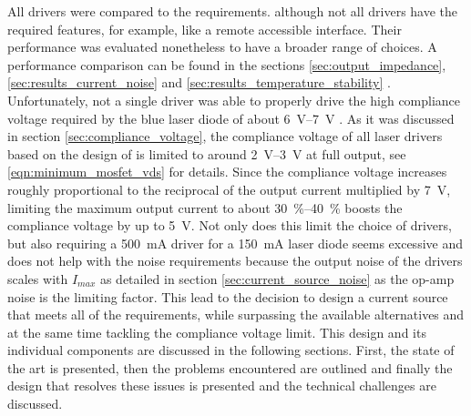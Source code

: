 All drivers were compared to the requirements. although not all drivers have the required features, for example, like a remote accessible interface. Their performance was evaluated nonetheless to have a broader range of choices. A performance comparison can be found in the sections \ref{sec:output_impedance}, \ref{sec:results_current_noise} and \ref{sec:results_temperature_stability} . Unfortunately, not a single driver was able to properly drive the high compliance voltage required by the blue laser diode  \cite{datasheet_osram_pl450b} of about \qtyrange[range-units = single,range-phrase=\textup{~to~}]{6}{7}{\V} \cite{datasheet_osram_pl450b}. As it was discussed in section \ref{sec:compliance_voltage}, the compliance voltage of all laser drivers based on the design of \citeauthor{libbrecht_hall} \cite{libbrecht_hall} is limited to around \qtyrange[range-units = single,range-phrase=\textup{~to~}]{2}{3}{\V} at full output, see \ref{eqn:minimum_mosfet_vds} for details. Since the compliance voltage increases roughly proportional to the reciprocal of the output current multiplied by \qty{7}{\V}, limiting the maximum output current to about \qtyrange[range-units = single]{30}{40}{\percent} boosts the compliance voltage by up to \qty{5}{\V}. Not only does this limit the choice of drivers, but also requiring a \qty{500}{\mA} driver for a \qty{150}{\mA} laser diode seems excessive and does not help with the noise requirements because the output noise of the drivers scales with $I_{max}$ as detailed in section \ref{sec:current_source_noise} as the op-amp noise is the limiting factor. This lead to the decision to design a current source that meets all of the requirements, while surpassing the available alternatives and at the same time tackling the compliance voltage limit. This design and its individual components are discussed in the following sections. First, the state of the art is presented, then the problems encountered are outlined and finally the design that resolves these issues is presented and the technical challenges are discussed.

